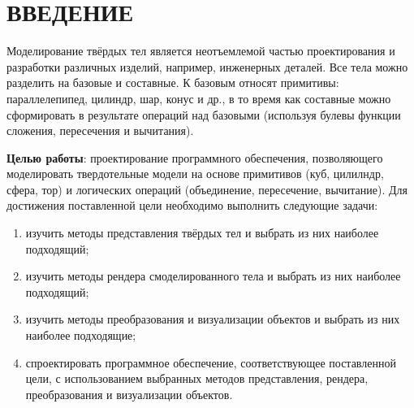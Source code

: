 \section*{ВВЕДЕНИЕ}

Моделирование твёрдых тел является неотъемлемой частью проектирования и разработки различных изделий, например, инженерных деталей. 
Все тела можно разделить на базовые и составные. 
К базовым относят примитивы: параллелепипед, цилиндр, шар, конус и др., в то время как составные можно сформировать в результате операций над базовыми (используя булевы функции сложения, пересечения и вычитания). 

\textbf{Целью работы}: проектирование программного обеспечения, позволяющего моделировать твердотельные модели на основе примитивов (куб, цилилндр, сфера, тор) и логических операций (объединение, пересечение, вычитание).
Для достижения поставленной цели необходимо выполнить следующие задачи:
\begin{enumerate}[label=\arabic*)]
	\item изучить методы представления твёрдых тел и выбрать из них наиболее подходящий;
	\item изучить методы рендера смоделированного тела и выбрать из них наиболее подходящий;
	\item изучить методы преобразования и визуализации объектов и выбрать из них наиболее подходящие;
	\item спроектировать программное обеспечение, соответствующее поставленной цели, с использованием выбранных методов представления, рендера, преобразования и визуализации объектов.
\end{enumerate}

